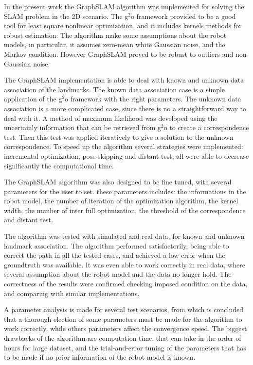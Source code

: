 \begin{conclusion}
\label{chap:conclusion}

In the present work the GraphSLAM algorithm was implemented for solving the SLAM problem in the 2D scenario. The g$^2$o framework provided to be a good tool for least square nonlinear optimization, and it includes kernels methods for robust estimation. The algorithm make some assumptions about the robot models, in particular, it assumes zero-mean white Gaussian noise, and the Markov condition. However GraphSLAM proved to be robust to outliers and non-Gaussian noise.

The GraphSLAM implementation is able to deal with known and unknown data association of the landmarks. The known data association case is a simple application of the g$^2$o framework with the right parameters. The unknown data association is a more complicated case, since there is no a straightforward way to deal with it. A method of maximum likelihood was developed using the uncertainly information that can be retrieved from g$^2$o to create a correspondence test. Then this test was applied iteratively to give a solution to the unknown correspondence. To speed up the algorithm several strategies were implemented: incremental optimization, pose skipping and distant test, all were able to decrease significantly the computational time.

The GraphSLAM algorithm was also designed to be fine tuned, with several parameters for the user to set. these parameters includes: the informations in the robot model, the number of iteration of the optimization algorithm, the kernel width, the number of inter full optimization, the threshold of the correspondence and distant test. 

The algorithm was tested with simulated and real data, for known and unknown landmark association. The algorithm performed satisfactorily, being able to correct the path in all the tested cases, and achieved a low error when the groundtruth was available. It was even able to work correctly in real data, where several assumption about the robot model and the data no longer hold. The correctness of the results were confirmed checking imposed condition on the data, and comparing with similar implementations. 

A parameter analysis is made for several test scenarios, from which is concluded that a thorough election of some parameters must be made for the algorithm to work correctly, while others parameters affect the convergence speed. The biggest drawbacks of the algorithm are computation time, that can take in the order of hours for large dataset, and the trial-and-error tuning of the parameters that has to be made if no prior information of the robot model is known. 


\end{conclusion}
